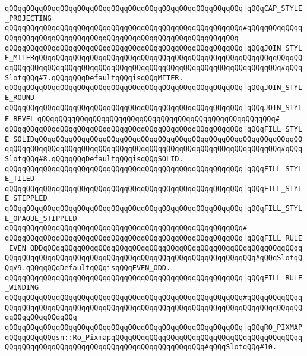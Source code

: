 \verb|qQQqqQQqqQQqqQQqqQQqqQQqqQQqqQQqqQQqqQQqqQQqqQQqqQQqqQQq|\verb#|qQQqCAP_STYLE_PROJECTING#\newline
\verb|qQQqqQQqqQQqqQQqqQQqqQQqqQQqqQQqqQQqqQQqqQQqqQQqqQQqqQQq#qQQqqQQqqQQqqQQqqQQqqQQqqQQqqQQqqQQqqQQqqQQqqQQqqQQqqQQqqQQqqQQqqQQq|\newline
\verb|qQQqqQQqqQQqqQQqqQQqqQQqqQQqqQQqqQQqqQQqqQQqqQQqqQQqqQQq|\verb#|qQQqJOIN_STYLE_MITERqQQqqQQqqQQqqQQqqQQqqQQqqQQqqQQqqQQqqQQqqQQqqQQqqQQqqQQqqQQqqQQqqQQqqQQqqQQqqQQqqQQqqQQqqQQqqQQqqQQqqQQqqQQqqQQqqQQqqQQqqQQqqQQq#\verb|#qQQqSlotqQQq#7.qQQqqQQqDefaultqQQqisqQQqMITER.|\newline
\verb|qQQqqQQqqQQqqQQqqQQqqQQqqQQqqQQqqQQqqQQqqQQqqQQqqQQqqQQq|\verb#|qQQqJOIN_STYLE_ROUND#\newline
\verb|qQQqqQQqqQQqqQQqqQQqqQQqqQQqqQQqqQQqqQQqqQQqqQQqqQQqqQQq|\verb#|qQQqJOIN_STYLE_BEVEL#\newline
\verb|qQQqqQQqqQQqqQQqqQQqqQQqqQQqqQQqqQQqqQQqqQQqqQQqqQQqqQQq#|\newline
\verb|qQQqqQQqqQQqqQQqqQQqqQQqqQQqqQQqqQQqqQQqqQQqqQQqqQQqqQQq|\verb#|qQQqFILL_STYLE_SOLIDqQQqqQQqqQQqqQQqqQQqqQQqqQQqqQQqqQQqqQQqqQQqqQQqqQQqqQQqqQQqqQQqqQQqqQQqqQQqqQQqqQQqqQQqqQQqqQQqqQQqqQQqqQQqqQQqqQQqqQQqqQQqqQQq#\verb|#qQQqSlotqQQq#8.qQQqqQQqDefaultqQQqisqQQqSOLID.|\newline
\verb|qQQqqQQqqQQqqQQqqQQqqQQqqQQqqQQqqQQqqQQqqQQqqQQqqQQqqQQq|\verb#|qQQqFILL_STYLE_TILED#\newline
\verb|qQQqqQQqqQQqqQQqqQQqqQQqqQQqqQQqqQQqqQQqqQQqqQQqqQQqqQQq|\verb#|qQQqFILL_STYLE_STIPPLED#\newline
\verb|qQQqqQQqqQQqqQQqqQQqqQQqqQQqqQQqqQQqqQQqqQQqqQQqqQQqqQQq|\verb#|qQQqFILL_STYLE_OPAQUE_STIPPLED#\newline
\verb|qQQqqQQqqQQqqQQqqQQqqQQqqQQqqQQqqQQqqQQqqQQqqQQqqQQqqQQq#|\newline
\verb|qQQqqQQqqQQqqQQqqQQqqQQqqQQqqQQqqQQqqQQqqQQqqQQqqQQqqQQq|\verb#|qQQqFILL_RULE_EVEN_ODDqQQqqQQqqQQqqQQqqQQqqQQqqQQqqQQqqQQqqQQqqQQqqQQqqQQqqQQqqQQqqQQqqQQqqQQqqQQqqQQqqQQqqQQqqQQqqQQqqQQqqQQqqQQqqQQqqQQqqQQq#\verb|#qQQqSlotqQQq#9.qQQqqQQqDefaultqQQqisqQQqEVEN_ODD.|\newline
\verb|qQQqqQQqqQQqqQQqqQQqqQQqqQQqqQQqqQQqqQQqqQQqqQQqqQQqqQQq|\verb#|qQQqFILL_RULE_WINDING#\newline
\verb|qQQqqQQqqQQqqQQqqQQqqQQqqQQqqQQqqQQqqQQqqQQqqQQqqQQqqQQq#qQQqqQQqqQQqqQQqqQQqqQQqqQQqqQQqqQQqqQQqqQQqqQQqqQQqqQQqqQQqqQQqqQQqqQQqqQQqqQQqqQQqqQQqqQQqqQQqqQQq|\newline
\verb|qQQqqQQqqQQqqQQqqQQqqQQqqQQqqQQqqQQqqQQqqQQqqQQqqQQqqQQq|\verb#|qQQqRO_PIXMAPqQQqqQQqqQQqsn::Ro_PixmapqQQqqQQqqQQqqQQqqQQqqQQqqQQqqQQqqQQqqQQqqQQqqQQqqQQqqQQqqQQqqQQqqQQqqQQqqQQqqQQqqQQqqQQqqQQq#\verb|#qQQqSlotqQQq#10.|\newline
